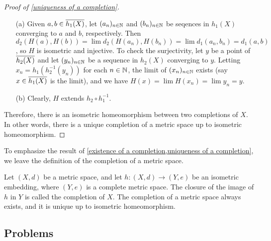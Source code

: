 \begin{proof}[Proof of \cref{uniqueness of a completion}]
    \begin{enumerate}
        \item[(a)]
        {
            Given $a, b\in\overline{h_1(X)}$, let $(a_n)_{n\in{\mathbb{N}}}$ and $(b_n)_{n\in{\mathbb{N}}}$ be seqences in $h_1(X)$ converging to $a$ and $b$, respectively.
            Then $d_2(H(a), H(b))=\lim d_2(H(a_n), H(b_n))=\lim d_1(a_n, b_n)=d_1(a, b)$, so $H$ is isometric and injective.
            To check the surjectivity, let $y$ be a point of $\overline{h_2(X)}$ and let $(y_n)_{n\in{\mathbb{N}}}$ be a sequence in $h_2(X)$ converging to $y$.
            Letting $x_n=h_1(h_2^{-1}(y_n))$ for each $n\in{\mathbb{N}}$, the limit of $(x_n)_{n\in{\mathbb{N}}}$ exists (say $x\in\overline{h_1(X)}$ is the limit), and we have $H(x)=\lim H(x_n)=\lim y_n=y$.
        }
        \item[(b)]
        {
            Clearly, $H$ extends $h_2\circ h_1^{-1}$.
        }
    \end{enumerate}
    Therefore, there is an isometric homeomorphism between two completions of $X$.
    In other words, there is a unique completion of a metric space up to isometric homeomorphism.
\end{proof}

To emphasize the result of \cref{existence of a completion,uniqueness of a completion}, we leave the definition of the completion of a metric space.
\begin{defi}
    Let $(X, d)$ be a metric space, and let $h: (X, d)\rightarrow (Y, e)$ be an isometric embedding, where $(Y, e)$ is a complete metric space.
    The closure of the image of $h$ in $Y$ is called the completion of $X$.
    The completion of a metric space always exists, and it is unique up to isometric homeomorphism.
\end{defi}


\subsection{Problems}


